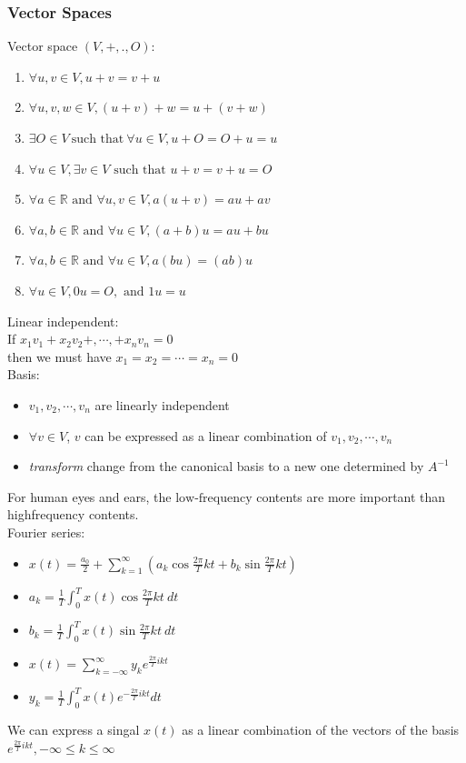 \subsubsection*{Vector Spaces}
Vector space $(V,+,.,O)$:
\begin{enumerate}
    \item $\forall u,v \in V, u+v=v+u$
    \item $\forall u,v,w \in V, (u+v)+w=u+(v+w)$
    \item $\exists O \in V\ \text{such that}\ \forall u \in V, u+O=O+u=u$
    \item $\forall u \in V,\exists v \in V \text{ such that } u+v=v+u=O$
    \item $\forall a\in\mathbb{R} \text{ and }\forall u,v \in V, a(u+v)=au+av$
    \item $\forall a,b \in\mathbb{R} \text{ and }\forall u\in V,(a+b)u=au+bu$
    \item $\forall a,b \in\mathbb{R} \text{ and }\forall u\in V,a(bu)=(ab)u$
    \item $\forall u\in V,0u=O, \text{ and }1u=u$
\end{enumerate}

Linear independent:\\
If $x_1v_1+x_2v_2+,\cdots,+x_nv_n=0$\\
then we must have $x_1=x_2=\cdots=x_n=0$\\

Basis:
\begin{itemize}
    \item $v_1,v_2,\cdots,v_n$ are linearly independent
    \item $\forall v\in V$, $v$ can be expressed as a linear combination of $v_1, v_2, \cdots, v_n$
    \item \emph{transform} change from the canonical basis to a new one determined by $A^{-1}$
\end{itemize}

For human eyes and ears, the $\text{low-frequency}$ contents are more important than highfrequency contents.\\

Fourier series:\\
\begin{itemize}
    \item $x(t)=\frac{a_0}{2}+\sum^\infty_{k=1}(a_k\cos\frac{2\pi}{T}kt+b_k\sin\frac{2\pi}{T}kt)$
    \item $a_k=\frac{1}{T}\int^T_0x(t)\cos\frac{2\pi}{T}kt\ dt$
    \item $b_k=\frac{1}{T}\int^T_0x(t)\sin\frac{2\pi}{T}kt\ dt$
    \item $x(t)=\sum^\infty_{k=-\infty}y_ke^{\frac{2\pi}{T}ikt}$
    \item $y_k=\frac{1}{T}\int^T_0x(t)e^{-\frac{2\pi}{T}ikt}dt$
\end{itemize}
We can express a singal $x(t)$ as a linear combination of the vectors of the basis
$e^{\frac{2\pi}{T}ikt},-\infty\le k\le\infty$

